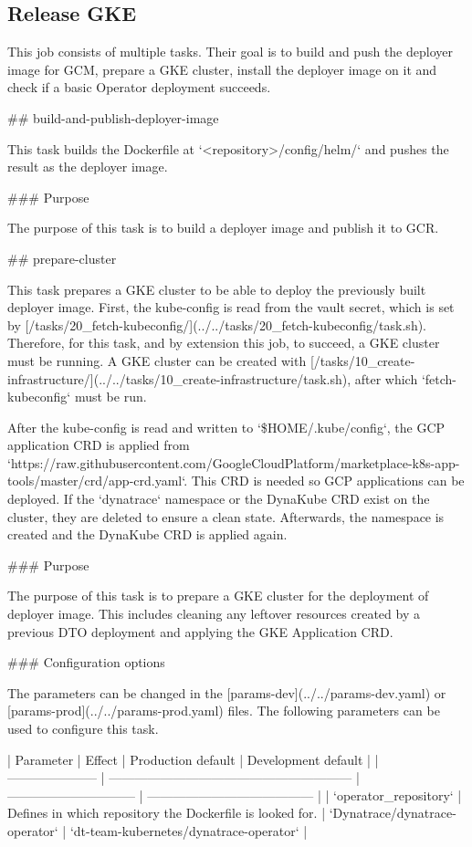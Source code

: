 \subsection{Release GKE}\label{subsec:release-gke}

This job consists of multiple tasks.
Their goal is to build and push the deployer image for GCM, prepare a GKE cluster, install the deployer image on it and check if a basic Operator deployment succeeds.

## build-and-publish-deployer-image

This task builds the Dockerfile at `<repository>/config/helm/` and pushes the result as the deployer image.

### Purpose

The purpose of this task is to build a deployer image and publish it to GCR.

## prepare-cluster

This task prepares a GKE cluster to be able to deploy the previously built deployer image.
First, the kube-config is read from the vault secret, which is set by [/tasks/20_fetch-kubeconfig/](../../tasks/20_fetch-kubeconfig/task.sh).
Therefore, for this task, and by extension this job, to succeed, a GKE cluster must be running.
A GKE cluster can be created with [/tasks/10_create-infrastructure/](../../tasks/10_create-infrastructure/task.sh), after which `fetch-kubeconfig` must be run.

After the kube-config is read and written to `\${HOME}/.kube/config`, the GCP application CRD is applied from `https://raw.githubusercontent.com/GoogleCloudPlatform/marketplace-k8s-app-tools/master/crd/app-crd.yaml`.
This CRD is needed so GCP applications can be deployed.
If the `dynatrace` namespace or the DynaKube CRD exist on the cluster, they are deleted to ensure a clean state.
Afterwards, the namespace is created and the DynaKube CRD is applied again.

### Purpose

The purpose of this task is to prepare a GKE cluster for the deployment of deployer image.
This includes cleaning any leftover resources created by a previous DTO deployment and applying the GKE Application CRD.

### Configuration options

The parameters can be changed in the [params-dev](../../params-dev.yaml) or [params-prod](../../params-prod.yaml) files.
The following parameters can be used to configure this task.

| Parameter             | Effect                                                    | Production default             | Development default                     |
| --------------------- | --------------------------------------------------------- | ------------------------------ | --------------------------------------- |
| `operator_repository` | Defines in which repository the Dockerfile is looked for. | `Dynatrace/dynatrace-operator` | `dt-team-kubernetes/dynatrace-operator` |

